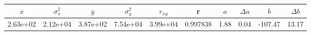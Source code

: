 \begin{tabular}{cccccccccc}
\toprule
$\overline{x}$ & $\sigma_x^2$ & $\overline{y}$ & $\sigma_y^2$ & $r_{xy}$ & r & $a$ & $\Delta a$ & $b$ & $\Delta b$ \\
\midrule
2.63e+02 & 2.12e+04 & 3.87e+02 & 7.54e+04 & 3.99e+04 & 0.997838 & 1.88 & 0.04 & -107.47 & 13.17 \\
\bottomrule
\end{tabular}
